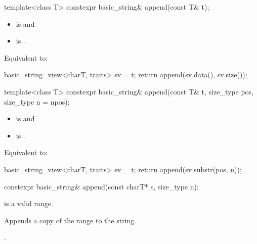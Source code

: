 %
\begin{itemdecl}
template<class T>
  constexpr basic_string& append(const T& t);
\end{itemdecl}

\begin{itemdescr}
\pnum
\constraints
\begin{itemize}
\item
{} is
 and
\item
{} is
.
\end{itemize}

\pnum
\effects
Equivalent to:
\begin{codeblock}
basic_string_view<charT, traits> sv = t;
return append(sv.data(), sv.size());
\end{codeblock}
\end{itemdescr}

%
\begin{itemdecl}
template<class T>
  constexpr basic_string& append(const T& t, size_type pos, size_type n = npos);
\end{itemdecl}

\begin{itemdescr}
\pnum
\constraints
\begin{itemize}
\item
{} is
 and
\item
{} is
.
\end{itemize}

\pnum
\effects
Equivalent to:
\begin{codeblock}
basic_string_view<charT, traits> sv = t;
return append(sv.substr(pos, n));
\end{codeblock}
\end{itemdescr}

%
\begin{itemdecl}
constexpr basic_string& append(const charT* s, size_type n);
\end{itemdecl}

\begin{itemdescr}
\pnum
\expects
{} is a valid range.

\pnum
\effects
Appends a copy of the range  to the string.

\pnum
\returns
{}.
\end{itemdescr}

